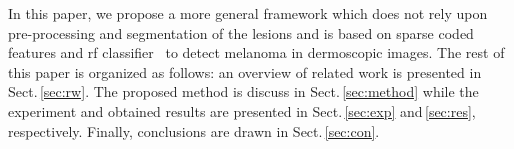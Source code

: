In this paper, we propose a more general framework which does not rely upon pre-processing and segmentation of the lesions and is based on sparse coded features and \ac{rf} classifier~\cite{breiman2001random} to detect melanoma in dermoscopic images.
The rest of this paper is organized as follows: an overview of related work is presented in Sect.\,\ref{sec:rw}.
The proposed method is discuss in Sect.\,\ref{sec:method} while the experiment and obtained results are presented in Sect.\,\ref{sec:exp} and\,\ref{sec:res}, respectively.
Finally, conclusions are drawn in Sect.\,\ref{sec:con}.

%
%

